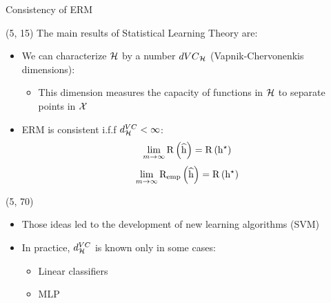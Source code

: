\begin{frame}{Consistency of \acs{ERM}}

  \begin{textblock}{90}(5, 15)
    The main results of Statistical Learning Theory are:
    \begin{itemize}
    \item<1-> We can characterize $\mathcal{H}$ by a number $d{VC}_{\mathcal{H}}$
      (Vapnik-Chervonenkis dimensions):
      \begin{itemize}
      \item This dimension measures the capacity of functions in $\mathcal{H}$ to
        separate points in $\mathcal{X}$
      \end{itemize}
    \item<2-> \ac{ERM} is consistent i.f.f $d^{VC}_{\mathcal{H}} < \infty$:
      \[
        \lim\limits_{m \to \infty} \mathrm{R} \left ( {\widehat{\mathrm{h}}} \right ) = \mathrm{R} \left ( {\mathrm{h}^{\star}} \right )
      \]
      \[
        \lim\limits_{m \to \infty} \mathrm{R_{emp}} \left ( {\widehat{\mathrm{h}}} \right ) = \mathrm{R} \left ( {\mathrm{h}^{\star}} \right )
      \]
    \end{itemize}
  \end{textblock}

  \begin{textblock}{90}(5, 70)
    \begin{itemize}
    \item<3-> Those ideas led to the development of new learning algorithms (SVM)
    \item<4-> In practice, $d^{VC}_{\mathcal{H}}$ is known only in some cases:
      \begin{itemize}
      \item Linear classifiers
      \item \ac{MLP}
      \end{itemize}
    \end{itemize}
  \end{textblock}
\end{frame}


